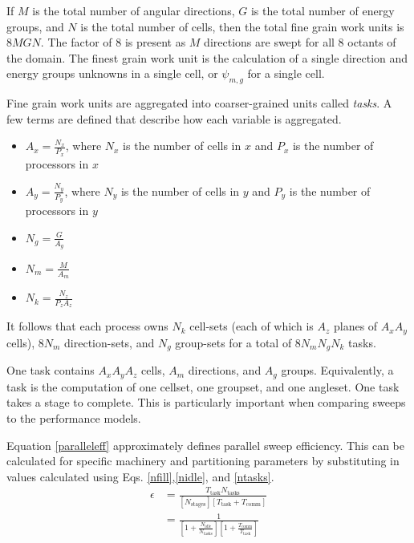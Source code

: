 \documentclass[11pt, letterpaper,titlepage,oneside]{article}
\begin{document}
If $M$ is the total number of angular directions, $G$ is the total number of energy groups, and $N$ is the total number of cells, then the total fine grain work units is $8MGN$. The factor of 8 is present as $M$ directions are swept for all 8 octants of the domain. The finest grain work unit is the calculation of a single direction and energy groups unknowns in a single cell, or $\psi_{m,g}$ for a single cell.

Fine grain work units are aggregated into coarser-grained units called \textit{tasks}. A few terms are defined that describe how each variable is aggregated.
\begin{itemize}
\item $A_x = \frac{N_x}{P_x}$, where $N_x$ is the number of cells in $x$ and $P_x$ is the number of processors in $x$
\item $A_y = \frac{N_y}{P_y}$, where $N_y$ is the number of cells in $y$ and $P_y$ is the number of processors in $y$
\item $N_g = \frac{G}{A_g}$
\item $N_m = \frac{M}{A_m}$
\item $N_k = \frac{N_z}{P_z A_z}$
\end{itemize}

It follows that each process owns $N_k$ cell-sets (each of which is $A_z$ planes of $A_x A_y$ cells), $8N_m$ direction-sets, and $N_g$ group-sets for a total of $8N_m N_g N_k$ tasks.

One task contains $A_x A_y A_z$ cells, $A_m$ directions, and $A_g$ groups. Equivalently, a task is the computation of one cellset, one groupset, and one angleset. One task takes a stage to complete.  This is particularly important when comparing sweeps to the performance models. 

Equation \ref{paralleleff} approximately defines parallel sweep efficiency. This can be calculated for specific machinery and partitioning parameters by substituting in values calculated using Eqs. \ref{nfill},\ref{nidle}, and \ref{ntasks}.
\begin{equation}\label{paralleleff}
\begin{split}
\epsilon &= \frac{T_{\text{task}} N_{\text{tasks}}}{[N_{\text{stages}}] [T_{\text{task}} + T_{\text{comm}}]} \\
            &=\frac{1}{[1+\frac{N_{\text{idle}}}{N_{\text{tasks}}}][1 + \frac{T_{\text{comm}}}{T_{\text{task}}}]}
\end{split}
\end{equation}
\end{document}
